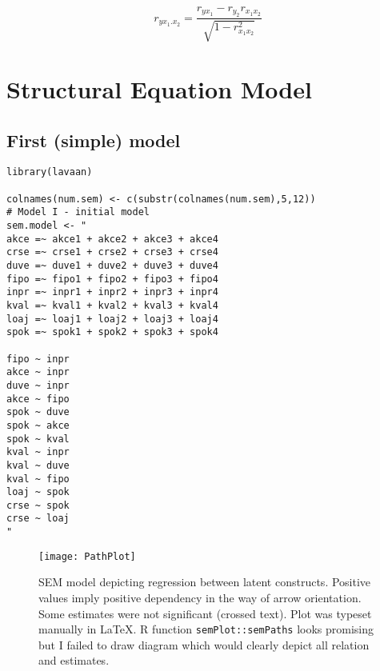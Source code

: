 \documentclass[10pt,a4paper]{article}
\begin{document}
\begin{equation}
r_{yx{_1}.x{_2}}=\frac{r_{yx_1}-r_{y_2}r_{x_1x_2}}{\sqrt{1-r_{x_1x_2}^2}}
\label{e:partial}
\end{equation}

\section{Structural Equation Model}
\subsection{First (simple) model}
\begin{lstlisting}
library(lavaan)

colnames(num.sem) <- c(substr(colnames(num.sem),5,12))
# Model I - initial model
sem.model <- "
akce =~ akce1 + akce2 + akce3 + akce4
crse =~ crse1 + crse2 + crse3 + crse4
duve =~ duve1 + duve2 + duve3 + duve4
fipo =~ fipo1 + fipo2 + fipo3 + fipo4
inpr =~ inpr1 + inpr2 + inpr3 + inpr4
kval =~ kval1 + kval2 + kval3 + kval4
loaj =~ loaj1 + loaj2 + loaj3 + loaj4
spok =~ spok1 + spok2 + spok3 + spok4

fipo ~ inpr
akce ~ inpr
duve ~ inpr
akce ~ fipo
spok ~ duve
spok ~ akce
spok ~ kval
kval ~ inpr
kval ~ duve
kval ~ fipo
loaj ~ spok
crse ~ spok
crse ~ loaj
"
\end{lstlisting}


\begin{figure}[ht]
\texttt{[image: PathPlot]}
\caption{SEM model depicting regression between latent constructs. Positive values imply positive dependency in the way of arrow orientation. Some estimates were not significant (crossed text). Plot was typeset manually in \LaTeX. R function \texttt{semPlot::semPaths} looks promising but I failed to draw diagram which would clearly depict all relation and estimates.}
\label{f:first_model}
\end{figure}
\end{document}

